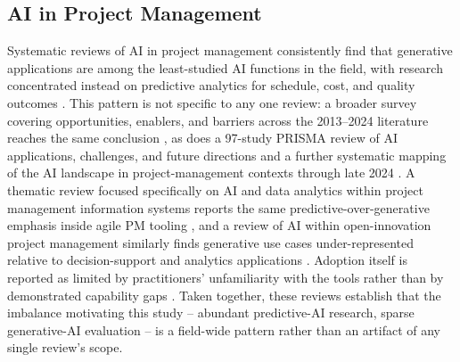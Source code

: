 \documentclass[conference]{IEEEtran}
\begin{document}
\subsection{AI in Project Management}
Systematic reviews of AI in project management consistently find that
generative applications are among the least-studied AI functions in the
field, with research concentrated instead on predictive analytics for
schedule, cost, and quality outcomes
\cite{aidriven2026usecases,aitools2025knowledge}. This pattern is not
specific to any one review: a broader survey covering opportunities,
enablers, and barriers across the 2013--2024 literature reaches the same
conclusion \cite{salimimoghadam2025rise}, as does a 97-study PRISMA review
of AI applications, challenges, and future directions
\cite{leveraging2025ai_pm} and a further systematic mapping of the AI
landscape in project-management contexts through late 2024
\cite{mapping2025ai_landscape}. A thematic review focused specifically on AI
and data analytics within project management information systems reports
the same predictive-over-generative emphasis inside agile PM tooling
\cite{jariwala2025pmis}, and a review of AI within open-innovation project
management similarly finds generative use cases under-represented relative
to decision-support and analytics applications \cite{openinnovation2024ai}.
Adoption itself is reported as limited by
practitioners' unfamiliarity with the tools rather than by demonstrated
capability gaps \cite{aitools2025knowledge}. Taken together, these reviews
establish that the imbalance motivating this study -- abundant predictive-AI
research, sparse generative-AI evaluation -- is a field-wide pattern rather
than an artifact of any single review's scope.
\end{document}

